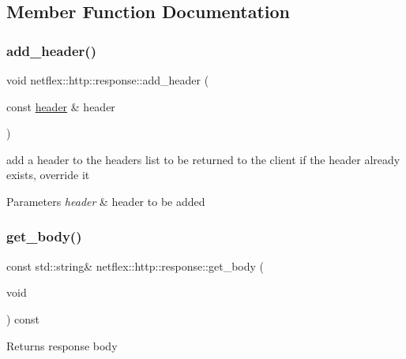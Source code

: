 \subsection{Member Function Documentation}
\mbox{\label{classnetflex_1_1http_1_1response_ae6b96db147ca22d2c3f5fe9b399b6cdb}} 
\subsubsection{\texorpdfstring{add\+\_\+header()}{add\_header()}}
{\footnotesize\ttfamily void netflex\+::http\+::response\+::add\+\_\+header (\begin{DoxyParamCaption}\item[{const \hyperlink{structnetflex_1_1http_1_1header}{header} \&}]{header }\end{DoxyParamCaption})}

add a header to the headers list to be returned to the client if the header already exists, override it


\begin{DoxyParams}{Parameters}
{\em header} & header to be added \\
\hline
\end{DoxyParams}
\mbox{\label{classnetflex_1_1http_1_1response_a13222bdab2d580652cec32177fbfaa0e}} 
\subsubsection{\texorpdfstring{get\+\_\+body()}{get\_body()}}
{\footnotesize\ttfamily const std\+::string\& netflex\+::http\+::response\+::get\+\_\+body (\begin{DoxyParamCaption}\item[{void}]{ }\end{DoxyParamCaption}) const}

\begin{DoxyReturn}{Returns}
response body 
\end{DoxyReturn}
\mbox{\label{classnetflex_1_1http_1_1response_aee706c42e2d04c91a5332b90f9741237}} 
